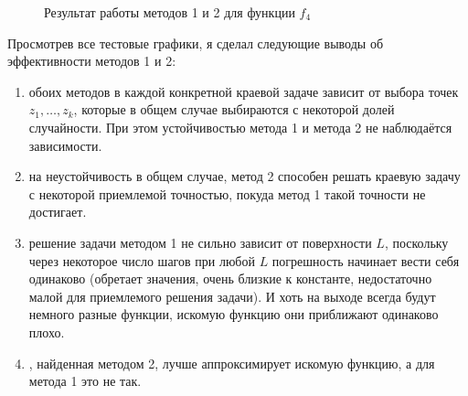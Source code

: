 \documentclass[a4paper]{article}
\begin{document}
            \begin{figure}[h!]
              \caption{Результат работы методов 1 и 2 для функции $f_4$}
              \label{send}
            \end{figure}

\FloatBarrier           
Просмотрев все тестовые графики, я сделал следующие выводы об эффективности методов 1 и 2:
\begin{enumerate}
  \item { обоих методов в каждой конкретной краевой задаче зависит от выбора точек $z_1, \dots, z_k$}, которые в общем случае выбираются с некоторой долей случайности. При этом { устойчивостью метода 1 и метода 2 не наблюдаётся зависимости}.
  \item { на неустойчивость в общем случае, метод 2 способен решать краевую задачу с некоторой приемлемой точностью, покуда метод 1 такой точности не достигает}.
  \item { решение задачи методом 1 не сильно зависит от поверхности $L$, поскольку через некоторое число шагов при любой $L$ погрешность начинает вести себя одинаково} (обретает значения, очень близкие к константе, недостаточно малой для приемлемого решения задачи). И хоть на выходе всегда будут немного разные функции, искомую функцию они приближают одинаково плохо.
  \item {, найденная методом 2, лучше аппроксимирует искомую функцию, а для метода 1 это не так}.
\end{enumerate}
\end{document}
